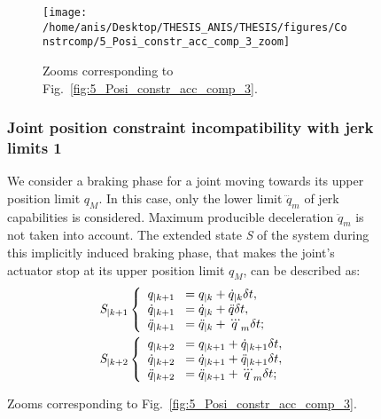 \begin{figure}[!htbp]
\begin{landscape}
\begin{figure}
\begin{minipage}[c]{0.5\linewidth}
\label{fig:5_Posi_constr_acc_comp_3}
\end{minipage}
\hfill
\begin{minipage}[c]{0.5\linewidth}
\texttt{[image: /home/anis/Desktop/THESIS\_ANIS/THESIS/figures/Constrcomp/5\_Posi\_constr\_acc\_comp\_3\_zoom]}
\caption{Zooms corresponding to Fig.~\ref{fig:5_Posi_constr_acc_comp_3}.} 
\label{fig:5_Posi_constr_acc_comp_3_zoom}
\end{minipage}%
\end{figure}
\end{landscape}
\subsubsection{Joint position constraint incompatibility with jerk limits 1}
\label{sec:secref2}
We consider a braking phase for a joint moving towards its upper position limit $q_M$. In this case, only the lower limit $\dddot{q}_m$ of jerk capabilities is considered. Maximum producible deceleration $\ddot{q}_m$ is not taken into account. The extended state \textit{S} of the system during this implicitly induced braking phase, that makes the joint's actuator stop at its upper position limit $q_M$, can be described as: 
\begin{equation} 
\begin{split}
\textit{S}_{|k+1}&\left\{\begin{array}{lcl}
q_{|k+1} \hspace{2mm}= q_{|k} + \dot{q}_{|k} \delta t, \\
\dot{q}_{|k+1} \hspace{2mm}= \dot{q}_{|k} + \ddot{q} \delta t, \\
\ddot{q}_{|k+1} \hspace{2mm}= \ddot{q}_{|k} + \dddot{q}_{m} \delta t;
\end{array}\right.\\
\textit{S}_{|k+2}&\left\{\begin{array}{lcl}
q_{|k+2} \hspace{2mm}= q_{|k+1} + \dot{q}_{|k+1} \delta t, \\
\dot{q}_{|k+2} \hspace{2mm}= \dot{q}_{|k+1} + \ddot{q}_{|k+1} \delta t, \\
\ddot{q}_{|k+2} \hspace{2mm}= \ddot{q}_{|k+1} + \dddot{q}_{m} \delta t;
\end{array}\right.\\

\end{split}
\end{equation}
\end{figure}
